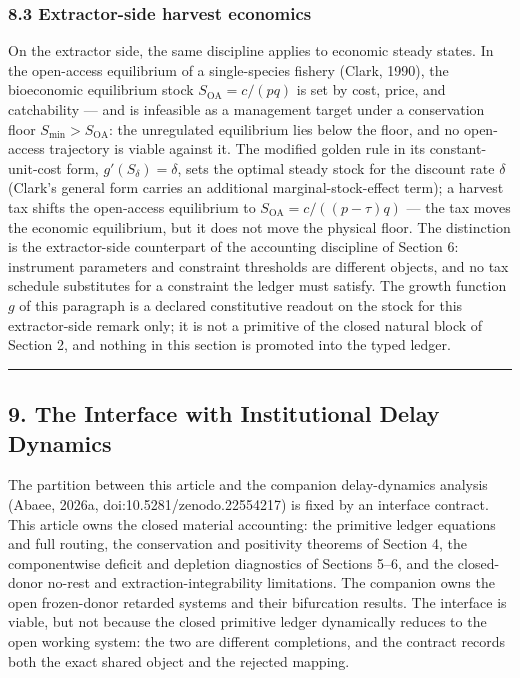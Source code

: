 \documentclass[11pt]{article}
\begin{document}
\subsubsection{8.3 Extractor-side harvest
economics}\label{extractor-side-harvest-economics}

On the extractor side, the same discipline applies to economic steady
states. In the open-access equilibrium of a single-species fishery
(Clark, 1990), the bioeconomic equilibrium stock
\(S_{\mathrm{OA}} = c/(pq)\) is set by cost, price, and catchability ---
and is infeasible as a management target under a conservation floor
\(S_{\min} > S_{\mathrm{OA}}\): the unregulated equilibrium lies below
the floor, and no open-access trajectory is viable against it. The
modified golden rule in its constant-unit-cost form,
\(g'(S_\delta) = \delta\), sets the optimal steady stock for the
discount rate \(\delta\) (Clark's general form carries an additional
marginal-stock-effect term); a harvest tax shifts the open-access
equilibrium to \(S_{\mathrm{OA}} = c/((p - \tau)q)\) --- the tax moves
the economic equilibrium, but it does not move the physical floor. The
distinction is the extractor-side counterpart of the accounting
discipline of Section 6: instrument parameters and constraint thresholds
are different objects, and no tax schedule substitutes for a constraint
the ledger must satisfy. The growth function \(g\) of this paragraph is
a declared constitutive readout on the stock for this extractor-side
remark only; it is not a primitive of the closed natural block of
Section 2, and nothing in this section is promoted into the typed
ledger.

\begin{center}\rule{0.5\linewidth}{0.5pt}\end{center}

\subsection{9. The Interface with Institutional Delay
Dynamics}\label{the-interface-with-institutional-delay-dynamics}

The partition between this article and the companion delay-dynamics analysis (Abaee, 2026a, doi:10.5281/zenodo.22554217) is fixed by an interface contract. This article owns the closed material accounting: the
primitive ledger equations and full routing, the conservation and
positivity theorems of Section 4, the componentwise deficit and
depletion diagnostics of Sections 5--6, and the closed-donor no-rest and
extraction-integrability limitations. The companion owns the open
frozen-donor retarded systems and their bifurcation results. The
interface is viable, but not because the closed primitive ledger
dynamically reduces to the open working system: the two are different
completions, and the contract records both the exact shared object and
the rejected mapping.
\end{document}
